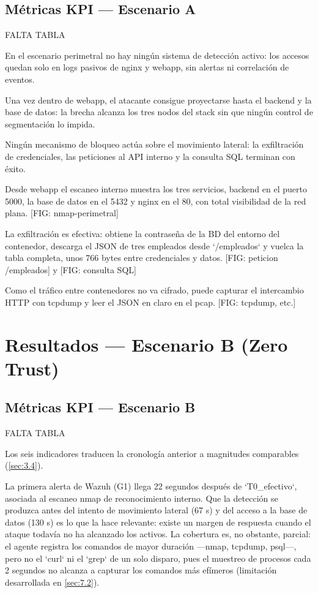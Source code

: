 \documentclass[11pt,spanish,listoffigures,listoftables]{tfgetsinf}
\begin{document}
        \subsection{Métricas KPI — Escenario A}
        FALTA TABLA

        En el escenario perimetral no hay ningún sistema de detección activo: los accesos quedan solo en logs pasivos de nginx y webapp, sin alertas ni correlación de eventos.

        Una vez dentro de webapp, el atacante consigue proyectarse hasta el backend y la base de datos: la brecha alcanza los tres nodos del stack sin que ningún control de segmentación lo impida.
        
        Ningún mecanismo de bloqueo actúa sobre el movimiento lateral: la exfiltración de credenciales, las peticiones al API interno y la consulta SQL terminan con éxito.
        
        Desde webapp el escaneo interno muestra los tres servicios, backend en el puerto 5000, la base de datos en el 5432 y nginx en el 80, con total visibilidad de la red plana. [FIG: nmap-perimetral]
        
        La exfiltración es efectiva: obtiene la contraseña de la BD del entorno del contenedor, descarga el JSON de tres empleados desde `/empleados` y vuelca la tabla completa, unos 766 bytes entre credenciales y datos. [FIG: peticion /empleados] y [FIG: consulta SQL]
        
        Como el tráfico entre contenedores no va cifrado, puede capturar el intercambio HTTP con tcpdump y leer el JSON en claro en el pcap. [FIG: tcpdump, etc.]

        
    \section{Resultados — Escenario B (Zero Trust)}
        
        \subsection{Métricas KPI — Escenario B}
        FALTA TABLA

        Los seis indicadores traducen la cronología anterior a magnitudes comparables (\cref{sec:3.4}).
        
        La primera alerta de Wazuh (G1) llega 22 segundos después de `T0\_efectivo`, asociada al escaneo nmap de reconocimiento interno. Que la detección se produzca antes del intento de movimiento lateral (67 s) y del acceso a la base de datos (130 s) es lo que la hace relevante: existe un margen de respuesta cuando el ataque todavía no ha alcanzado los activos. La cobertura es, no obstante, parcial: el agente registra los comandos de mayor duración —nmap, tcpdump, psql—, pero no el `curl` ni el `grep` de un solo disparo, pues el muestreo de procesos cada 2 segundos no alcanza a capturar los comandos más efímeros (limitación desarrollada en \cref{sec:7.2}).
        
\end{document}
